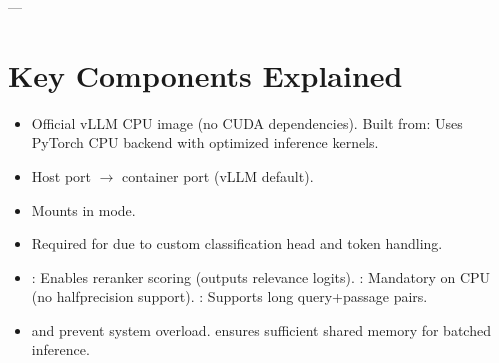 \documentclass[letterpaper,10pt,english]{sphinxmanual}
\begin{document}
\sphinxAtStartPar
—


\section{Key Components Explained}
\label{\detokenize{vllm-cpu:key-components-explained}}\begin{itemize}
\item {} 
\sphinxAtStartPar
{}
\sphinxhyphen{} Official vLLM CPU image (no CUDA dependencies).
\sphinxhyphen{} Built from: 
\sphinxhyphen{} Uses PyTorch CPU backend with optimized inference kernels.

\item {} 
\sphinxAtStartPar
{}
\sphinxhyphen{} Host port  \(\rightarrow\) container port  (vLLM default).

\item {} 
\sphinxAtStartPar
{}
\sphinxhyphen{} Mounts  in  mode.

\item {} 
\sphinxAtStartPar
{}
\sphinxhyphen{} Required for  due to custom classification head and token handling.

\item {} 
\sphinxAtStartPar
{}
\sphinxhyphen{} : Enables reranker scoring (outputs relevance logits).
\sphinxhyphen{} : Mandatory on CPU (no half\sphinxhyphen{}precision support).
\sphinxhyphen{} : Supports long query+passage pairs.

\item {} 
\sphinxAtStartPar
{}
\sphinxhyphen{}  and  prevent system overload.
\sphinxhyphen{}  ensures sufficient shared memory for batched inference.

\end{itemize}
\end{document}
